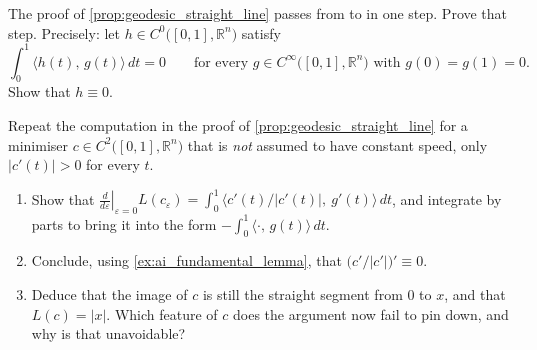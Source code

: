 \begin{aiexercise}
\label{ex:ai_fundamental_lemma}
The proof of \cref{prop:geodesic_straight_line} passes from  to  in one step. Prove that step. Precisely: let
$h \in C^0\big([0,1],\mathbb{R}^n\big)$ satisfy
\[\int_0^1 \big\langle h(t),\,g(t)\big\rangle\,dt = 0
  \qquad\text{for every } g \in C^\infty\big([0,1],\mathbb{R}^n\big) \text{ with } g(0)=g(1)=0.\]
Show that $h \equiv 0$.

\end{aiexercise}

\begin{aiexercise}
\label{ex:ai_variation_without_constant_speed}
Repeat the computation in the proof of \cref{prop:geodesic_straight_line} for a minimiser
$c \in C^2\big([0,1],\mathbb{R}^n\big)$ that is \emph{not} assumed to have constant speed, only
$\lvert c'(t)\rvert > 0$ for every $t$.
\begin{enumerate}[label=\textbf{(\alph*)}]
  \item Show that $\left.\frac{d}{d\varepsilon}\right|_{\varepsilon=0}L(c_\varepsilon)
    = \int_0^1 \big\langle c'(t)/\lvert c'(t)\rvert,\ g'(t)\big\rangle\,dt$, and integrate by
    parts to bring it into the form $-\int_0^1\langle \cdot,\,g(t)\rangle\,dt$.
  \item Conclude, using \cref{ex:ai_fundamental_lemma}, that
    $\big(c'/\lvert c'\rvert\big)' \equiv 0$.
  \item Deduce that the image of $c$ is still the straight segment from $0$ to $x$, and that
    $L(c) = \lvert x\rvert$. Which feature of $c$ does the argument now fail to pin down, and
    why is that unavoidable?
\end{enumerate}
\end{aiexercise}

